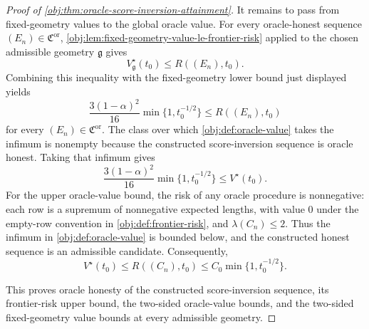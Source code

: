 \begin{proof}[Proof of \cref{obj:thm:oracle-score-inversion-attainment}]
It remains to pass from fixed-geometry values to the global oracle value. For every oracle-honest sequence \((E_n)\in\mathfrak C^{\mathrm{or}}\), \cref{obj:lem:fixed-geometry-value-le-frontier-risk} applied to the chosen admissible geometry \(\mathfrak g\) gives
\[
V_{\mathfrak g}^\star(t_0)
\le
R((E_n),t_0).
\]
Combining this inequality with the fixed-geometry lower bound just displayed yields
\[
\frac{3(1-\alpha)^2}{16}
\min\{1,t_0^{-1/2}\}
\le
R((E_n),t_0)
\]
for every \((E_n)\in\mathfrak C^{\mathrm{or}}\). The class over which \cref{obj:def:oracle-value} takes the infimum is nonempty because the constructed score-inversion sequence is oracle honest. Taking that infimum gives
\[
\frac{3(1-\alpha)^2}{16}
\min\{1,t_0^{-1/2}\}
\le
V^\star(t_0).
\]
For the upper oracle-value bound, the risk of any oracle procedure is nonnegative: each row is a supremum of nonnegative expected lengths, with value \(0\) under the empty-row convention in \cref{obj:def:frontier-risk}, and \(\lambda(C_n)\le2\). Thus the infimum in \cref{obj:def:oracle-value} is bounded below, and the constructed honest sequence is an admissible candidate. Consequently,
\[
V^\star(t_0)
\le
R((C_n),t_0)
\le
C_0\min\{1,t_0^{-1/2}\}.
\] %

This proves oracle honesty of the constructed score-inversion sequence, its frontier-risk upper bound, the two-sided oracle-value bounds, and the two-sided fixed-geometry value bounds at every admissible geometry.
\end{proof}

